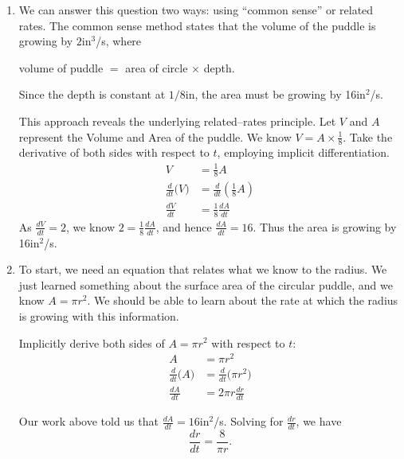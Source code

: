{\begin{enumerate}
\item We can answer this question two ways: using ``common sense'' or related rates. The common sense method states that the volume of the puddle is growing by $2$in$^3$/s, where 
	\begin{center} volume of puddle $=$ area of circle $\times$ depth.\end{center}
Since the depth is constant at $1/8$in, the area must be growing by 16in$^2$/s.

This approach reveals the underlying related--rates principle. Let $V$ and $A$ represent the Volume and Area of the puddle. We know $V= A\times \frac18$. Take the derivative of both sides with respect to $t$, employing implicit differentiation.
\begin{align*}
V &= \frac18A\\
\frac{d}{dt}\big(V\big) &= \frac{d}{dt}\left(\frac18A\right)\\
\frac{dV}{dt} &=	\frac18\frac{dA}{dt}
\end{align*} 
As $\frac{dV}{dt} = 2$, we know $2 = \frac18\frac{dA}{dt}$, and hence $\frac{dA}{dt} = 16$. Thus the area is growing by 16in$^2$/s.

\drawexampleline
\item		To start, we need an equation that relates what we know to the radius. We just learned something about the surface area of the circular puddle, and we know $A = \pi r^2$. We should be able to learn about the rate at which the radius is growing with this information. 

Implicitly derive both sides of $A=\pi r^2$ with respect to $t$:
\begin{align*}
	A 	&= \pi r^2 \\
	\frac{d}{dt}\big(A\big) &= \frac{d}{dt}\big(\pi r^2\big)\\
	\frac{dA}{dt} &= 2\pi r\frac{dr}{dt}
\end{align*}

Our work above told us that $\frac{dA}{dt} = 16$in$^2$/s. Solving for $\frac{dr}{dt}$, we have $$\frac{dr}{dt} = \frac{8}{\pi r}.$$


\end{enumerate}}
